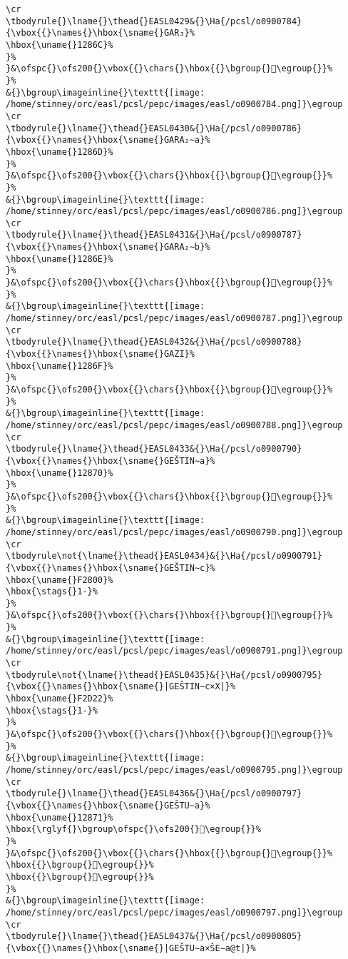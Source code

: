 \begin{verbatim}
\cr
\tbodyrule{}\lname{}\thead{}EASL0429&{}\Ha{/pcsl/o0900784}{\vbox{{}\names{}\hbox{\sname{}GAR₃}%
\hbox{\uname{}1286C}%
}%
}&\ofspc{}\ofs200{}\vbox{{}\chars{}\hbox{{}\bgroup{}𒡬\egroup{}}%
}%
&{}\bgroup\imageinline{}\texttt{[image: /home/stinney/orc/easl/pcsl/pepc/images/easl/o0900784.png]}\egroup
\cr
\tbodyrule{}\lname{}\thead{}EASL0430&{}\Ha{/pcsl/o0900786}{\vbox{{}\names{}\hbox{\sname{}GARA₂∼a}%
\hbox{\uname{}1286D}%
}%
}&\ofspc{}\ofs200{}\vbox{{}\chars{}\hbox{{}\bgroup{}𒡭\egroup{}}%
}%
&{}\bgroup\imageinline{}\texttt{[image: /home/stinney/orc/easl/pcsl/pepc/images/easl/o0900786.png]}\egroup
\cr
\tbodyrule{}\lname{}\thead{}EASL0431&{}\Ha{/pcsl/o0900787}{\vbox{{}\names{}\hbox{\sname{}GARA₂∼b}%
\hbox{\uname{}1286E}%
}%
}&\ofspc{}\ofs200{}\vbox{{}\chars{}\hbox{{}\bgroup{}𒡮\egroup{}}%
}%
&{}\bgroup\imageinline{}\texttt{[image: /home/stinney/orc/easl/pcsl/pepc/images/easl/o0900787.png]}\egroup
\cr
\tbodyrule{}\lname{}\thead{}EASL0432&{}\Ha{/pcsl/o0900788}{\vbox{{}\names{}\hbox{\sname{}GAZI}%
\hbox{\uname{}1286F}%
}%
}&\ofspc{}\ofs200{}\vbox{{}\chars{}\hbox{{}\bgroup{}𒡯\egroup{}}%
}%
&{}\bgroup\imageinline{}\texttt{[image: /home/stinney/orc/easl/pcsl/pepc/images/easl/o0900788.png]}\egroup
\cr
\tbodyrule{}\lname{}\thead{}EASL0433&{}\Ha{/pcsl/o0900790}{\vbox{{}\names{}\hbox{\sname{}GEŠTIN∼a}%
\hbox{\uname{}12870}%
}%
}&\ofspc{}\ofs200{}\vbox{{}\chars{}\hbox{{}\bgroup{}𒡰\egroup{}}%
}%
&{}\bgroup\imageinline{}\texttt{[image: /home/stinney/orc/easl/pcsl/pepc/images/easl/o0900790.png]}\egroup
\cr
\tbodyrule\not{\lname{}\thead{}EASL0434}&{}\Ha{/pcsl/o0900791}{\vbox{{}\names{}\hbox{\sname{}GEŠTIN∼c}%
\hbox{\uname{}F2800}%
\hbox{\stags{}1-}%
}%
}&\ofspc{}\ofs200{}\vbox{{}\chars{}\hbox{{}\bgroup{}󲠀\egroup{}}%
}%
&{}\bgroup\imageinline{}\texttt{[image: /home/stinney/orc/easl/pcsl/pepc/images/easl/o0900791.png]}\egroup
\cr
\tbodyrule\not{\lname{}\thead{}EASL0435}&{}\Ha{/pcsl/o0900795}{\vbox{{}\names{}\hbox{\sname{}|GEŠTIN∼c×X|}%
\hbox{\uname{}F2D22}%
\hbox{\stags{}1-}%
}%
}&\ofspc{}\ofs200{}\vbox{{}\chars{}\hbox{{}\bgroup{}󲴢\egroup{}}%
}%
&{}\bgroup\imageinline{}\texttt{[image: /home/stinney/orc/easl/pcsl/pepc/images/easl/o0900795.png]}\egroup
\cr
\tbodyrule{}\lname{}\thead{}EASL0436&{}\Ha{/pcsl/o0900797}{\vbox{{}\names{}\hbox{\sname{}GEŠTU∼a}%
\hbox{\uname{}12871}%
\hbox{\rglyf{}\bgroup\ofspc{}\ofs200{}𒡱\egroup{}}%
}%
}&\ofspc{}\ofs200{}\vbox{{}\chars{}\hbox{{}\bgroup{}𒡱\egroup{}}%
\hbox{{}\bgroup{}𒡲\egroup{}}%
\hbox{{}\bgroup{}𒡳\egroup{}}%
}%
&{}\bgroup\imageinline{}\texttt{[image: /home/stinney/orc/easl/pcsl/pepc/images/easl/o0900797.png]}\egroup
\cr
\tbodyrule{}\lname{}\thead{}EASL0437&{}\Ha{/pcsl/o0900805}{\vbox{{}\names{}\hbox{\sname{}|GEŠTU∼a×ŠE∼a@t|}%

\end{verbatim}
